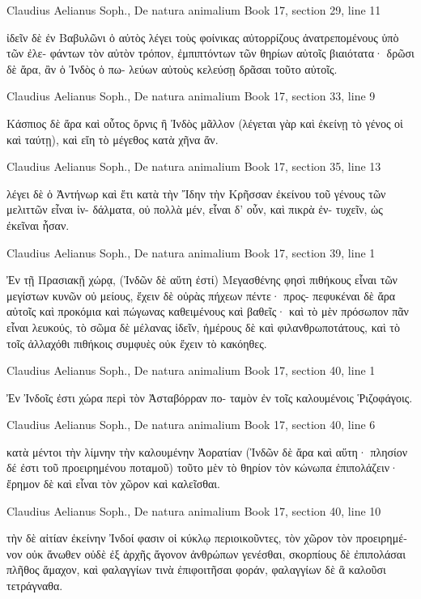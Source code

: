 \documentclass[12pt,letterpaper,twoside,final]{memoir}
\begin{document}
\begin{greek}
Claudius Aelianus Soph., De natura animalium 
Book 17, section 29, line 11

         ἰδεῖν δὲ ἐν Βαβυλῶνι ὁ αὐτὸς λέγει τοὺς 
φοίνικας αὐτορρίζους ἀνατρεπομένους ὑπὸ τῶν ἐλε-
φάντων τὸν αὐτὸν τρόπον, ἐμπιπτόντων τῶν θηρίων 
αὐτοῖς βιαιότατα· δρῶσι δὲ ἄρα, ἂν ὁ Ἰνδὸς ὁ πω-
λεύων αὐτοὺς κελεύσῃ δρᾶσαι τοῦτο αὐτοῖς. 



Claudius Aelianus Soph., De natura animalium 
Book 17, section 33, line 9

Κάσπιος δὲ ἄρα καὶ οὗτος ὄρνις ἢ Ἰνδὸς μᾶλλον 
(λέγεται γὰρ καὶ ἐκείνῃ τὸ γένος οἱ καὶ ταύτῃ), καὶ 
εἴη τὸ μέγεθος κατὰ χῆνα ἄν. 



Claudius Aelianus Soph., De natura animalium 
Book 17, section 35, line 13

     λέγει δὲ ὁ Ἀντήνωρ καὶ ἔτι κατὰ τὴν Ἴδην τὴν 
Κρῆσσαν ἐκείνου τοῦ γένους τῶν μελιττῶν εἶναι ἰν-
δάλματα, οὐ πολλὰ μέν, εἶναι δ' οὖν, καὶ πικρὰ ἐν-
τυχεῖν, ὡς ἐκεῖναι ἦσαν. 



Claudius Aelianus Soph., De natura animalium 
Book 17, section 39, line 1

Ἐν τῇ Πρασιακῇ χώρᾳ, (Ἰνδῶν δὲ αὕτη ἐστί) 
Μεγασθένης φησὶ πιθήκους εἶναι τῶν μεγίστων 
κυνῶν οὐ μείους, ἔχειν δὲ οὐρὰς πήχεων πέντε· προς-
πεφυκέναι δὲ ἄρα αὐτοῖς καὶ προκόμια καὶ πώγωνας 
καθειμένους καὶ βαθεῖς· καὶ τὸ μὲν πρόσωπον πᾶν 
εἶναι λευκούς, τὸ σῶμα δὲ μέλανας ἰδεῖν, ἡμέρους δὲ 
καὶ φιλανθρωποτάτους, καὶ τὸ τοῖς ἀλλαχόθι πιθήκοις 
συμφυὲς οὐκ ἔχειν τὸ κακόηθες. 



Claudius Aelianus Soph., De natura animalium 
Book 17, section 40, line 1

Ἐν Ἰνδοῖς ἐστι χώρα περὶ τὸν Ἀσταβόρραν πο-
ταμὸν ἐν τοῖς καλουμένοις Ῥιζοφάγοις. 



Claudius Aelianus Soph., De natura animalium 
Book 17, section 40, line 6

                          κατὰ μέντοι τὴν λίμνην τὴν 
καλουμένην Ἀορατίαν (Ἰνδῶν δὲ ἄρα καὶ αὕτη· 
πλησίον δέ ἐστι τοῦ προειρημένου ποταμοῦ) τοῦτο 
μὲν τὸ θηρίον τὸν κώνωπα ἐπιπολάζειν· ἔρημον δὲ 
καὶ εἶναι τὸν χῶρον καὶ καλεῖσθαι. 



Claudius Aelianus Soph., De natura animalium 
Book 17, section 40, line 10

                                          τὴν δὲ αἰτίαν 
ἐκείνην Ἰνδοί φασιν οἱ κύκλῳ περιοικοῦντες, τὸν 
χῶρον τὸν προειρημένον οὐκ ἄνωθεν οὐδὲ ἐξ ἀρχῆς 
ἄγονον ἀνθρώπων γενέσθαι, σκορπίους δὲ ἐπιπολάσαι 
πλῆθος ἄμαχον, καὶ φαλαγγίων τινὰ ἐπιφοιτῆσαι   
φοράν, φαλαγγίων δὲ ἃ καλοῦσι τετράγναθα. 




\end{greek}
\end{document}
